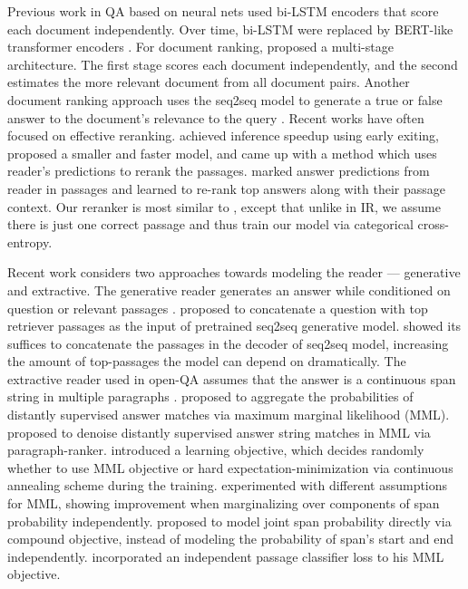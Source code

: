 \documentclass[11pt,a4paper]{article}
\begin{document}
\begin{description}[style=unboxed,leftmargin=0em,listparindent=\parindent,parsep=0pt,]
\item[Passage reranker.]

Previous work in QA based on neural nets used bi-LSTM encoders \cite{wang2018r3,lee2018ranking} that score each document independently. Over time, bi-LSTM were replaced by BERT-like transformer encoders \cite{qiao2019understanding,wang2019multi}. 
 For document ranking, \citet{nogueira2019multistage} proposed a multi-stage architecture. The first stage scores each document independently, and the second estimates the more relevant document from all document pairs. Another document ranking approach uses the seq2seq model to generate a true or false answer to the document's relevance to the query \cite{nogueira2020document}. 
Recent works have often focused on effective reranking. \citet{xin2020early} achieved inference speedup using early exiting, \citet{jang2020document} proposed a smaller and faster model, and \citet{mao2021reader} came up with a method which uses reader's predictions to rerank the passages.
\citet{iyer2020reconsider} marked answer predictions from reader in passages and learned to re-rank top answers along with their passage context.
Our reranker is most similar to \citet{nogueira2019passage, luan2020sparse}, except that unlike in IR, we assume there is just one correct passage and thus train our model via categorical cross-entropy.

\item[Reader.] 







Recent work considers two approaches towards modeling the reader --- generative and extractive. The generative reader generates an answer while conditioned on question or relevant passages \cite{roberts2020much,lewis2020retrieval}. \citet{min2020ambigqa} proposed to concatenate a question with top retriever passages as the input of pretrained seq2seq generative model. \citet{izacard2020leveraging} showed its suffices to concatenate the passages in the decoder of seq2seq model, increasing the amount of top-passages the model can depend on dramatically.
The extractive reader used in open-QA assumes that the answer is a continuous span string in multiple paragraphs  \cite{chen2017reading}. \citet{clark-gardner-2018-simple} proposed to aggregate the probabilities of distantly supervised answer matches via maximum marginal likelihood (MML). \citet{lin2018denoising} proposed to denoise distantly supervised answer string matches in MML via paragraph-ranker. \citet{min2019discrete} introduced a learning objective, which decides randomly whether to use MML objective or hard expectation-minimization via continuous annealing scheme during the training. \citet{cheng2020probabilistic} experimented with different assumptions for MML, showing improvement when marginalizing over components of span probability independently. \citet{fajcik2020rethinking} proposed to model joint span probability directly via compound objective, instead of modeling the probability of span's start and end independently.  \citet{karpukhin2020dense} incorporated an independent passage classifier loss to his MML objective.


\end{description}
\end{document}
